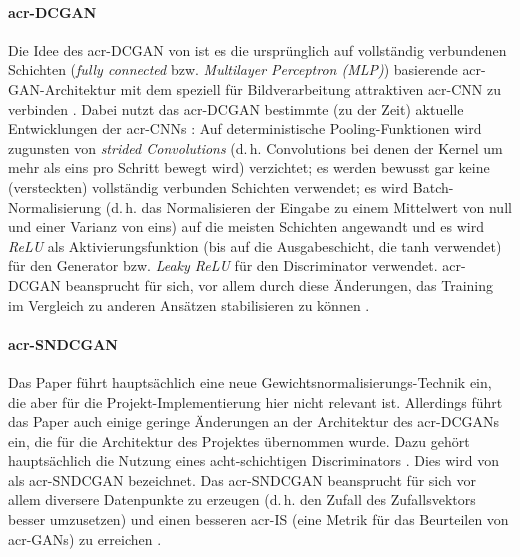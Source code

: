 \paragraph{\gls{acr-DCGAN}} Die Idee des \gls{acr-DCGAN} von
\citeauthor{radford2015unsupervised} \cite{radford2015unsupervised} ist es die
ursprünglich \cite[vgl.][]{goodfellow2014generative} auf vollständig verbundenen
Schichten (\emph{fully connected} bzw. \emph{Multilayer Perceptron (MLP)})
basierende \gls{acr-GAN}-Architektur mit dem speziell für Bildverarbeitung
attraktiven \gls{acr-CNN} zu verbinden \cite{radford2015unsupervised}.
Dabei nutzt das \gls{acr-DCGAN} bestimmte (zu der Zeit) aktuelle Entwicklungen
der \gls{acr-CNN}s \cite[vgl.][S. 3]{radford2015unsupervised}: Auf
deterministische Pooling-Funktionen wird zugunsten von \emph{strided
Convolutions} (d.\,h. Convolutions bei denen der Kernel um mehr als eins pro
Schritt bewegt wird) verzichtet; es werden bewusst gar keine (versteckten)
vollständig verbunden Schichten verwendet; es wird Batch-Normalisierung (d.\,h.
das Normalisieren der Eingabe zu einem Mittelwert von null und einer Varianz von
eins) auf die meisten Schichten angewandt und es wird \emph{ReLU} als
Aktivierungsfunktion (bis auf die Ausgabeschicht, die tanh verwendet) für den
Generator bzw. \emph{Leaky ReLU} für den Discriminator verwendet.
\gls{acr-DCGAN} beansprucht für sich, vor allem durch diese Änderungen, das
Training im Vergleich zu anderen Ansätzen stabilisieren zu können \cite{radford2015unsupervised}.

\paragraph{\gls{acr-SNDCGAN}} Das Paper 
\cite{miyato2018spectral} führt hauptsächlich eine neue
Gewichtsnormalisierungs-Technik ein, die aber für die
Pro\-jekt-Imp\-le\-men\-tier\-ung hier nicht relevant ist. Allerdings führt das
Paper auch einige geringe Änderungen an der Architektur des \gls{acr-DCGAN}s
ein, die für die Architektur des Projektes übernommen wurde. Dazu gehört
hauptsächlich die Nutzung eines acht-schichtigen Discriminators \cite{kurach2018gan}. Dies wird von \citeauthor{kurach2018gan} \cite{kurach2018gan}
als \gls{acr-SNDCGAN} bezeichnet. Das \gls{acr-SNDCGAN} beansprucht für sich vor
allem diversere Datenpunkte zu erzeugen (d.\,h. den Zufall des Zufallsvektors
besser umzusetzen) und einen besseren \gls{acr-IS} (eine Metrik für das
Beurteilen von \gls{acr-GAN}s) zu erreichen \cite{miyato2018spectral}.

